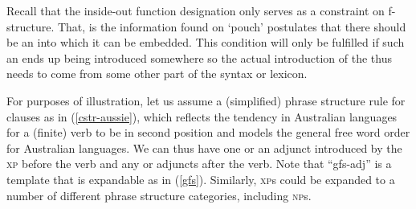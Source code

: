 \documentclass[output=paper,hidelinks]{langscibook}
\begin{document}

Recall that the inside-out function designation only serves as a
constraint on  f-structure. That, is the information found on `pouch'
postulates  that there should be an \OBJ into which it can be embedded.   This
condition will only be fulfilled if 
such an \OBJ ends up  being introduced somewhere so the actual 
introduction of the \OBJ thus needs to come from some other part of the syntax
or lexicon. 

For purposes of illustration, 
let us assume a (simplified) phrase structure rule for clauses as in (\ref{cstr-aussie}),
which reflects the tendency in Australian languages for a (finite) verb to be in
second position and models the general free word order for Australian
languages. We can thus have one {\GF} or an adjunct introduced by the \textsc{xp} before
the verb and any {\GF} or adjuncts after the verb.  Note that 
``{\sc gfs-adj}'' is
a template that is expandable as in
(\ref{gfs}).  Similarly, \textsc{xp}s could be expanded to a number of different phrase
structure categories, including \textsc{np}s. 


\ea \label{cstr-aussie} 
      \z

      

      
\end{document}
